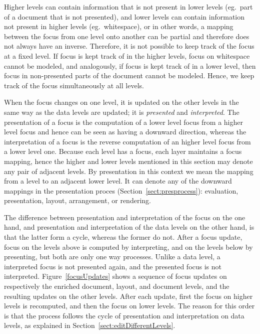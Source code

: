 Higher levels can contain information that is not present in lower levels (eg.\ part of a document that is not presented), and lower levels can contain information not present in higher levels (eg.\ whitespace), or in other words, a mapping between the focus from one level onto another can be partial and therefore does not always have an inverse. Therefore, it is not possible to keep track of the focus at a fixed level. If focus is kept track of in the higher levels, focus on whitespace cannot be modeled, and analogously, if focus is kept track of in a lower level, then focus in non-presented parts of the document cannot be modeled. Hence, we keep track of the focus simultaneously at all levels. 

When the focus changes on one level, it is updated on the other levels in the same way as the data levels are updated; it is {\em presented} and {\em interpreted}. The presentation of a focus is the computation of a lower level focus from a higher level focus and hence can be seen as having a downward direction, whereas the interpretation of a focus is the reverse computation of an higher level focus from a lower level one. Because each level has a focus, each layer maintains a focus mapping, hence the higher and lower levels mentioned in this section may denote any pair of adjacent levels. By presentation in this context we mean the mapping from a level to an adjacent lower level. It can denote any of the downward mappings in the presentation proces (Section~\ref{sect:presprocess}): evaluation, presentation, layout, arrangement, or rendering.

The difference between presentation and interpretation of the focus on the one hand, and presentation and interpretation of the data levels on the other hand, is that the latter form a cycle, whereas the former do not. After a focus update, focus on the levels above is computed by interpreting, and on the levels below by presenting, but both are only one way processes. Unlike a data level, a interpreted focus is not presented again, and the presented focus is not interpreted. Figure~\ref{focusUpdates} shows a sequence of focus updates on respectively the enriched document, layout, and document levels, and the resulting updates on the other levels. After each update, first the focus on higher levels is recomputed, and then the focus on lower levels. The reason for this order is that the process follows the cycle of presentation and interpretation on data levels, as explained in Section~\ref{sect:editDifferentLevels}.


